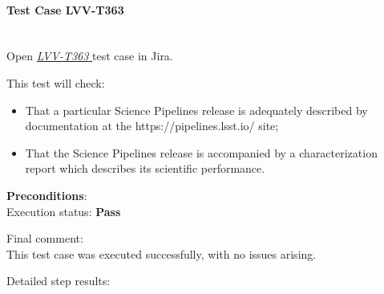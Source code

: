 \documentclass[DM,STR,toc]{lsstdoc}
\providecommand{\tightlist}{
  \setlength{\itemsep}{0pt}\setlength{\parskip}{0pt}}
\begin{document}
    \paragraph{Test Case LVV-T363 }\mbox{}\\

Open  \href{https://jira.lsstcorp.org/secure/Tests.jspa#/testCase/LVV-T363}{\textit{ LVV-T363 } }
test case in Jira.

    This test will check:

\begin{itemize}
\tightlist
\item
  That a particular Science Pipelines release is adequately described by
  documentation at the https://pipelines.lsst.io/ site;
\item
  That the Science Pipelines release is accompanied by a
  characterization report which describes its scientific performance.
\end{itemize}


    {\bf Preconditions}:\\
    

    Execution status: {\bf Pass }

    Final comment:\\This test case was executed successfully, with no issues arising.



    Detailed step results:
\end{document}
